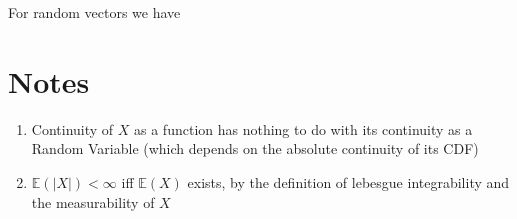 \documentclass[a4paper,portrait,columns=2]{cheatsheet}
\begin{document}
For random vectors we have

\section{Notes}
\begin{enumerate}
	\item Continuity of \(X\) as a function has nothing to do with its continuity as a Random Variable (which depends on the absolute continuity of its CDF) \cite{976739}

	\item \(\mathbb{E}(|X|)<\infty\) iff \(\mathbb{E}(X)\) exists, by the definition of lebesgue integrability and the measurability of \(X\)
\end{enumerate}

\newpage



\end{document}
